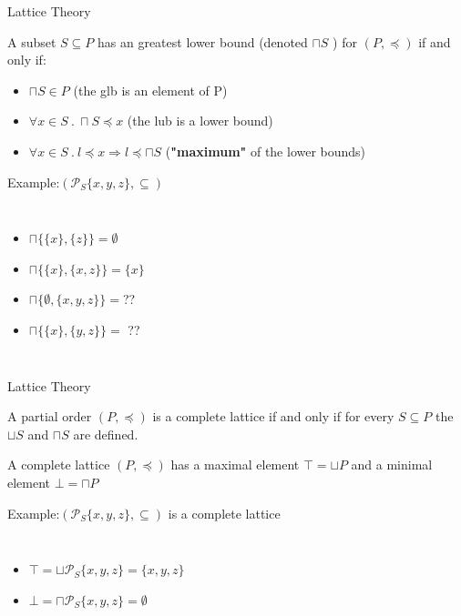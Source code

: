 \begin{frame}{Lattice Theory}
\begin{definition}
	A subset $S \subseteq P$ has an greatest lower bound (denoted $\sqcap S$ ) for     $(P,\preceq)$ if and only if:
	\begin{itemize} 
		\item  $\sqcap S \in P$ (the glb is an element of P)
		\item $ \forall x \in S~.~   \sqcap S \preceq x$ (the lub is a lower bound)
		\item $ \forall x \in S ~.~l \preceq x \Rightarrow l \preceq \sqcap S  $ (\textbf{"maximum"} of the lower bounds)
	\end{itemize}
\end{definition}
\begin{exampleblock}{Example:$(\mathcal{P}_S\{x,y,z\}, \subseteq)$}
	\begin{columns}
		
		\footnotesize
		\begin{itemize}
			\item  $\sqcap\{\{x\},\{z\}\}= \emptyset$
			\item  $\sqcap\{\{x\},\{x,z\}\}=\{x\}$
			\item  $\sqcap\{\emptyset,\{x,y,z\}\}=$??
			\item  $\sqcap \{\{x\},\{y,z\}\}=$ ??
		\end{itemize}
	\end{columns}
\end{exampleblock}
\end{frame}

\begin{frame}{Lattice Theory}
\begin{definition}
	A partial order $(P,\preceq)$ is a complete lattice if and only if for every  $S    \subseteq P$ the $\sqcup S$ and $\sqcap S$ are  defined.
\end{definition}

\begin{definition}
	A complete lattice  $(P,\preceq)$ has a maximal element $\top = \sqcup P$ and a minimal element  $\bot = \sqcap P$
\end{definition}

\begin{exampleblock}{Example:$(\mathcal{P}_S\{x,y,z\}, \subseteq)$ is a complete lattice}
	\begin{columns}
		\column{0.4\linewidth}
		
		\column{0.6\linewidth}
		\footnotesize
		\begin{itemize}
			\item  $\top = \sqcup \mathcal{P}_S\{x,y,z\}=\{x,y,z\}$
		     \item  $\bot = \sqcap \mathcal{P}_S\{x,y,z\}=\emptyset$
		\end{itemize}
	\end{columns}
\end{exampleblock}
\end{frame}

